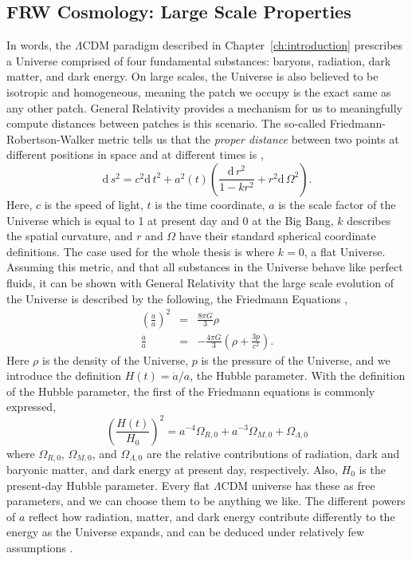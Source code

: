 \subsection{FRW Cosmology: Large Scale Properties}

In words, the $\Lambda$CDM paradigm described in Chapter~\ref{ch:introduction} prescribes a Universe comprised of four fundamental substances: baryons, radiation, dark matter, and dark energy. On large scales, the Universe is also believed to be isotropic and homogeneous, meaning the patch we occupy is the exact same as any other patch. General Relativity provides a mechanism for us to meaningfully compute distances between patches is this scenario. The so-called Friedmann-Robertson-Walker metric tells us that the \textit{proper distance} between two points at different positions in space and at different times is \citep{kolb_turner, dodelson},
\begin{equation}
\text{d}\,s^2 = c^2 \text{d}\,t^2 + a^2(t) \left(\frac{\text{d}\,r^2}{1 - k r^2} + r^2\text{d}\,\Omega^2 \right).
\end{equation}
Here, $c$ is the speed of light, $t$ is the time coordinate, $a$ is the scale factor of the Universe which is equal to 1 at present day and 0 at the Big Bang, $k$ describes the spatial curvature, and $r$ and $\Omega$ have their standard spherical coordinate definitions. The case used for the whole thesis is where $k=0$, a flat Universe. Assuming this metric, and that all substances in the Universe behave like perfect fluids, it can be shown with General Relativity that the large scale evolution of the Universe is described by the following, the Friedmann Equations \citep{kolb_turner,dodelson},
\begin{eqnarray}
\left( \frac{\dot{a}}{a} \right)^2 &=& \frac{8 \pi G}{3} \rho\\
\frac{\ddot{a}}{a} &=& -\frac{4 \pi G}{3}\left(\rho + \frac{3 p}{c^2}\right).
\end{eqnarray}
Here $\rho$ is the density of the Universe, $p$ is the pressure of the Universe, and we introduce the definition $H(t) = \dot{a} / a$, the Hubble parameter. With the definition of the Hubble parameter, the first of the Friedmann equations is commonly expressed,
\begin{equation}
\left(\frac{H(t)}{H_0}\right)^2 = a^{-4} \Omega_{R,0} + a^{-3} \Omega_{M,0} + \Omega_{\Lambda,0}
\end{equation}
where $\Omega_{R,0}$, $\Omega_{M,0}$, and $\Omega_{\Lambda,0}$ are the relative contributions of radiation, dark and baryonic matter, and dark energy at present day, respectively. Also, $H_0$ is the present-day Hubble parameter. Every flat $\Lambda$CDM universe has these as free parameters, and we can choose them to be anything we like. The different powers of $a$ reflect how radiation, matter, and dark energy contribute differently to the energy as the Universe expands, and can be deduced under relatively few assumptions \citep{kolb_turner,dodelson}.

